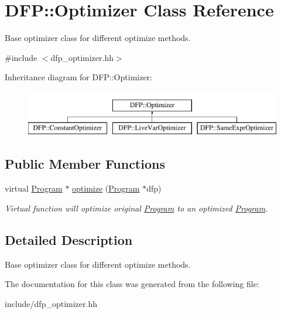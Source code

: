 \hypertarget{class_d_f_p_1_1_optimizer}{}\section{D\+FP\+:\+:Optimizer Class Reference}
\label{class_d_f_p_1_1_optimizer}


Base optimizer class for different optimize methods.  




{\ttfamily \#include $<$dfp\+\_\+optimizer.\+hh$>$}

Inheritance diagram for D\+FP\+:\+:Optimizer\+:\begin{figure}[H]
\begin{center}
\leavevmode
\includegraphics[height=2.000000cm]{class_d_f_p_1_1_optimizer}
\end{center}
\end{figure}
\subsection*{Public Member Functions}
\begin{DoxyCompactItemize}
\item 
virtual \hyperlink{class_d_f_p_1_1_program}{Program} $\ast$ \hyperlink{class_d_f_p_1_1_optimizer_a192e408971c647a028e7c6a2282adc43}{optimize} (\hyperlink{class_d_f_p_1_1_program}{Program} $\ast$dfp)\hypertarget{class_d_f_p_1_1_optimizer_a192e408971c647a028e7c6a2282adc43}{}\label{class_d_f_p_1_1_optimizer_a192e408971c647a028e7c6a2282adc43}

\begin{DoxyCompactList}\small\item\em Virtual function will optimize original \hyperlink{class_d_f_p_1_1_program}{Program} to an optimized \hyperlink{class_d_f_p_1_1_program}{Program}. \end{DoxyCompactList}\end{DoxyCompactItemize}


\subsection{Detailed Description}
Base optimizer class for different optimize methods. 

The documentation for this class was generated from the following file\+:\begin{DoxyCompactItemize}
\item 
include/dfp\+\_\+optimizer.\+hh\end{DoxyCompactItemize}
